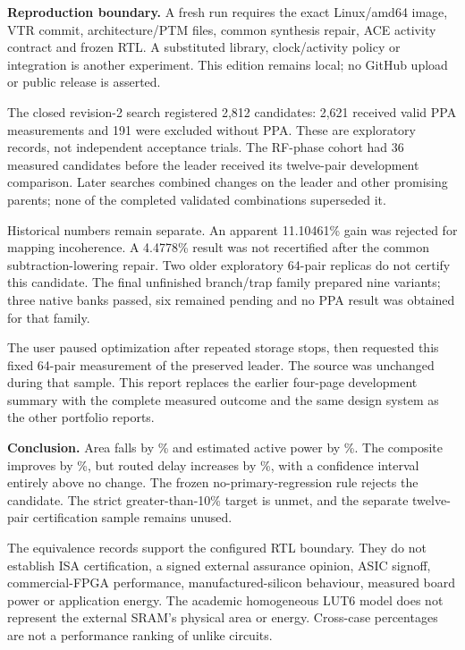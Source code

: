 \begin{scopebox}\textbf{Reproduction boundary.} A fresh run requires the exact Linux/amd64 image, VTR commit, architecture/PTM files, common synthesis repair, ACE activity contract and frozen RTL. A substituted library, clock/activity policy or integration is another experiment. This edition remains local; no GitHub upload or public release is asserted.\end{scopebox}

The closed revision-2 search registered 2,812 candidates: 2,621 received valid PPA measurements and 191 were excluded without PPA. These are exploratory records, not independent acceptance trials. The RF-phase cohort had 36 measured candidates before the leader received its twelve-pair development comparison. Later searches combined changes on the leader and other promising parents; none of the completed validated combinations superseded it.

Historical numbers remain separate. An apparent 11.10461\% gain was rejected for mapping incoherence. A 4.4778\% result was not recertified after the common subtraction-lowering repair. Two older exploratory 64-pair replicas do not certify this candidate. The final unfinished branch/trap family prepared nine variants; three native banks passed, six remained pending and no PPA result was obtained for that family.

The user paused optimization after repeated storage stops, then requested this fixed 64-pair measurement of the preserved leader. The source was unchanged during that sample. This report replaces the earlier four-page development summary with the complete measured outcome and the same design system as the other portfolio reports.

\begin{claimbox}\textbf{Conclusion.} Area falls by \AreaImprovement\% and estimated active power by \PowerImprovement\%. The composite improves by \CompositeImprovement\%, but routed delay increases by \DelayIncrease\%, with a confidence interval entirely above no change. The frozen no-primary-regression rule rejects the candidate. The strict greater-than-10\% target is unmet, and the separate twelve-pair certification sample remains unused.\end{claimbox}

The equivalence records support the configured RTL boundary. They do not establish ISA certification, a signed external assurance opinion, ASIC signoff, commercial-FPGA performance, manufactured-silicon behaviour, measured board power or application energy. The academic homogeneous LUT6 model does not represent the external SRAM's physical area or energy. Cross-case percentages are not a performance ranking of unlike circuits.

